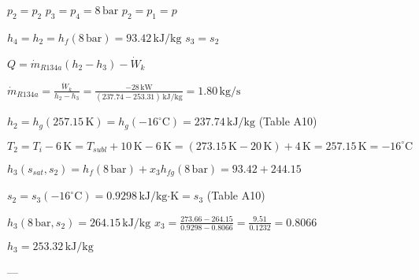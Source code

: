 \( p_2 = p_2 \)  
\( p_3 = p_4 = 8 \, \text{bar} \)  
\( p_2 = p_1 = p \)  

\( h_4 = h_2 = h_f(8 \, \text{bar}) = 93.42 \, \text{kJ/kg} \)  
\( s_3 = s_2 \)  

\( Q = \dot{m}_{R134a}(h_2 - h_3) - \dot{W}_k \)  

\( \dot{m}_{R134a} = \frac{\dot{W}_k}{h_2 - h_3} = \frac{-28 \, \text{kW}}{(237.74 - 253.31) \, \text{kJ/kg}} = 1.80 \, \text{kg/s} \)  

\( h_2 = h_g(257.15 \, \text{K}) = h_g(-16^\circ \text{C}) = 237.74 \, \text{kJ/kg} \) (Table A10)  

\( T_2 = T_i - 6 \, \text{K} = T_{subl} + 10 \, \text{K} - 6 \, \text{K} = (273.15 \, \text{K} - 20 \, \text{K}) + 4 \, \text{K} = 257.15 \, \text{K} = -16^\circ \text{C} \)  

\( h_3(s_{sat}, s_2) = h_f(8 \, \text{bar}) + x_3 h_{fg}(8 \, \text{bar}) = 93.42 + 244.15 \)  

\( s_2 = s_3(-16^\circ \text{C}) = 0.9298 \, \text{kJ/kg·K} = s_3 \) (Table A10)  

\( h_3(8 \, \text{bar}, s_2) = 264.15 \, \text{kJ/kg} \)  
\( x_3 = \frac{273.66 - 264.15}{0.9298 - 0.8066} = \frac{9.51}{0.1232} = 0.8066 \)  

\( h_3 = 253.32 \, \text{kJ/kg} \)  

---